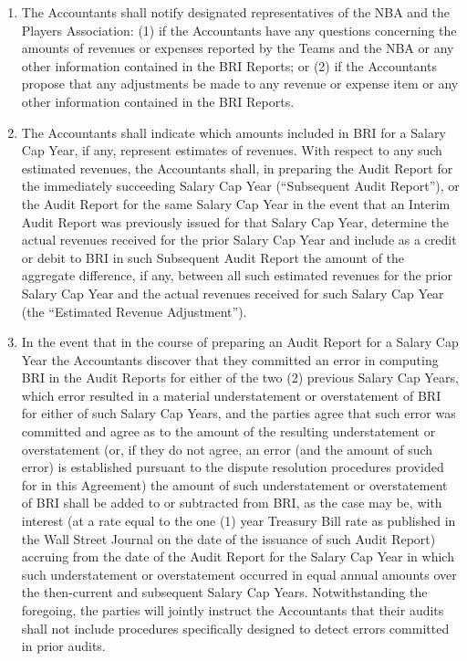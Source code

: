 \documentclass[
]{book}
\begin{document}
\begin{enumerate}
\item
  The Accountants shall notify designated representatives of the NBA and the Players Association: (1) if the Accountants have any questions concerning the amounts of revenues or expenses reported by the Teams and the NBA or any other information contained in the BRI Reports; or (2) if the Accountants propose that any adjustments be made to any revenue or expense item or any other information contained in the BRI Reports.
\item
  The Accountants shall indicate which amounts included in BRI for a Salary Cap Year, if any, represent estimates of revenues. With respect to any such estimated revenues, the Accountants shall, in preparing the Audit Report for the immediately succeeding Salary Cap Year (``Subsequent Audit Report''), or the Audit Report for the same Salary Cap Year in the event that an Interim Audit Report was previously issued for that Salary Cap Year, determine the actual revenues received for the prior Salary Cap Year and include as a credit or debit to BRI in such Subsequent Audit Report the amount of the aggregate difference, if any, between all such estimated revenues for the prior Salary Cap Year and the actual revenues received for such Salary Cap Year (the ``Estimated Revenue Adjustment'').
\item
  In the event that in the course of preparing an Audit Report for a Salary Cap Year the Accountants discover that they committed an error in computing BRI in the Audit Reports for either of the two (2) previous Salary Cap Years, which error resulted in a material understatement or overstatement of BRI for either of such Salary Cap Years, and the parties agree that such error was committed and agree as to the amount of the resulting understatement or overstatement (or, if they do not agree, an error (and the amount of such error) is established pursuant to the dispute resolution procedures provided for in this Agreement) the amount of such understatement or overstatement of BRI shall be added to or subtracted from BRI, as the case may be, with interest (at a rate equal to the one (1) year Treasury Bill rate as published in the Wall Street Journal on the date of the issuance of such Audit Report) accruing from the date of the Audit Report for the Salary Cap Year in which such understatement or overstatement occurred in equal annual amounts over the then-current and subsequent Salary Cap Years. Notwithstanding the foregoing, the parties will jointly instruct the Accountants that their audits shall not include procedures specifically designed to detect errors committed in prior audits.

\end{enumerate}
\end{document}
